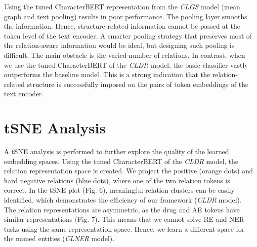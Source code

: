 \documentclass[11pt]{article}
\begin{document}
\begin{table}[!ht]
    \centering
    \caption{RE - linear classification setting}
\end{table}

 \vspace{-3mm}
Using the tuned CharacterBERT representation from the \textit{CLGS} model (mean graph and text pooling) results in poor performance. The pooling layer smooths the information. Hence, structure-related information cannot be passed at the token level of the text encoder. A smarter pooling strategy that preserves most of the relation-aware information would be ideal, but designing such pooling is difficult. The main obstacle is the varied number of relations. In contrast, when we use the tuned CharacterBERT of the \textit{CLDR} model, the basic classifier vastly outperforms the baseline model. This is a strong indication that the relation-related structure is successfully imposed on the pairs of token embeddings of the text encoder.

\vspace{-1mm}
\section{tSNE Analysis}

A tSNE analysis is performed to further explore the quality of the learned embedding spaces. Using the tuned CharacterBERT of the \textit{CLDR} model, the relation representation space is created. We project the positive (orange dots) and hard negative relations (blue dots), where one of the two relation tokens is correct. In the tSNE plot (Fig. 6), meaningful relation clusters can be easily identified, which demonstrates the efficiency of our framework (\textit{CLDR} model). The relation representations are asymmetric, as the drug and AE tokens have similar representations (Fig. 7). This means that we cannot solve RE and NER tasks using the same representation space. Hence, we learn a different space for the named entities (\textit{CLNER} model).
\end{document}

